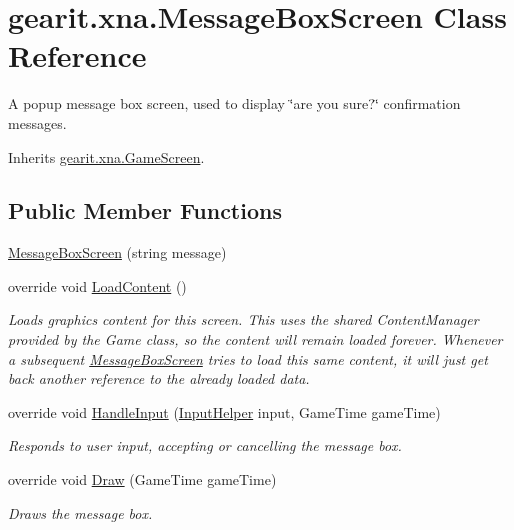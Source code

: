 \hypertarget{classgearit_1_1xna_1_1_message_box_screen}{\section{gearit.\+xna.\+Message\+Box\+Screen Class Reference}
\label{classgearit_1_1xna_1_1_message_box_screen}
}


A popup message box screen, used to display \char`\"{}are you sure?\char`\"{} confirmation messages.  




Inherits \hyperlink{classgearit_1_1xna_1_1_game_screen}{gearit.\+xna.\+Game\+Screen}.

\subsection*{Public Member Functions}
\begin{DoxyCompactItemize}
\item 
\hyperlink{classgearit_1_1xna_1_1_message_box_screen_a850e4d195ee784e90d5f98e8e017bb6b}{Message\+Box\+Screen} (string message)
\item 
override void \hyperlink{classgearit_1_1xna_1_1_message_box_screen_a3ce168733ccf3e542313a2294068d4d9}{Load\+Content} ()
\begin{DoxyCompactList}\small\item\em Loads graphics content for this screen. This uses the shared Content\+Manager provided by the Game class, so the content will remain loaded forever. Whenever a subsequent \hyperlink{classgearit_1_1xna_1_1_message_box_screen}{Message\+Box\+Screen} tries to load this same content, it will just get back another reference to the already loaded data. \end{DoxyCompactList}\item 
override void \hyperlink{classgearit_1_1xna_1_1_message_box_screen_aa8514f4828a6e738de6494e7c18b544c}{Handle\+Input} (\hyperlink{classgearit_1_1xna_1_1_input_helper}{Input\+Helper} input, Game\+Time game\+Time)
\begin{DoxyCompactList}\small\item\em Responds to user input, accepting or cancelling the message box. \end{DoxyCompactList}\item 
override void \hyperlink{classgearit_1_1xna_1_1_message_box_screen_a1d15b10577b7c510f59e5a4d28967ad7}{Draw} (Game\+Time game\+Time)
\begin{DoxyCompactList}\small\item\em Draws the message box. \end{DoxyCompactList}\end{DoxyCompactItemize}
